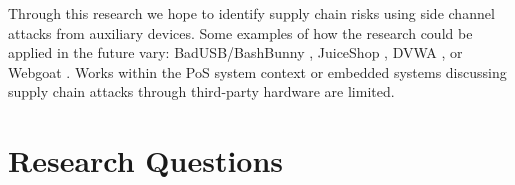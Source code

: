 Through this research we hope to identify supply chain risks using side channel attacks from auxiliary devices. Some examples of how the research could be applied in the future vary: BadUSB/BashBunny \autocite{hak5BashBunny}, JuiceShop \autocite{OWASPJuiceShop}, DVWA \autocite{woodDAMNVULNERABLEWEB2023}, or Webgoat \autocite{OWASPWebGoatOWASP}. Works within the PoS system context or embedded systems discussing supply chain attacks through third-party hardware are limited.




\section{Research Questions}  \label{researchquestions}

